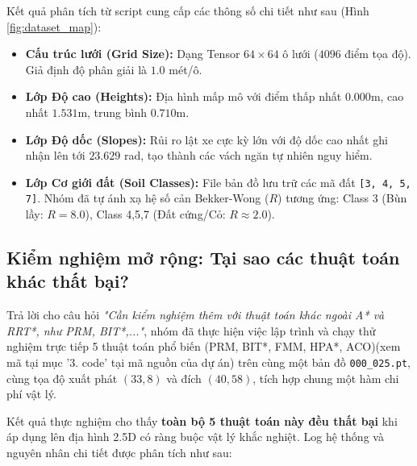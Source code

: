 \documentclass[12pt, a4paper]{article}
\begin{document}
Kết quả phân tích từ script cung cấp các thông số chi tiết như sau (Hình \ref{fig:dataset_map}):
\begin{itemize}
    \item \textbf{Cấu trúc lưới (Grid Size):} Dạng Tensor $64 \times 64$ ô lưới ($4096$ điểm tọa độ). Giả định độ phân giải là $1.0$ mét/ô.
    \item \textbf{Lớp Độ cao (Heights):} Địa hình mấp mô với điểm thấp nhất $0.000$m, cao nhất $1.531$m, trung bình $0.710$m.
    \item \textbf{Lớp Độ dốc (Slopes):} Rủi ro lật xe cực kỳ lớn với độ dốc cao nhất ghi nhận lên tới $23.629$ rad, tạo thành các vách ngăn tự nhiên nguy hiểm.
    \item \textbf{Lớp Cơ giới đất (Soil Classes):} File bản đồ lưu trữ các mã đất \texttt{[3, 4, 5, 7]}. Nhóm đã tự ánh xạ hệ số cản Bekker-Wong ($R$) tương ứng: Class 3 (Bùn lầy: $R=8.0$), Class 4,5,7 (Đất cứng/Cỏ: $R \approx 2.0$).
\end{itemize}

\subsection{Kiểm nghiệm mở rộng: Tại sao các thuật toán khác thất bại?}
Trả lời cho câu hỏi \textit{"Cần kiểm nghiệm thêm với thuật toán khác ngoài A* và RRT*, như PRM, BIT*,..."}, nhóm đã thực hiện việc lập trình và chạy thử nghiệm trực tiếp 5 thuật toán phổ biến (PRM, BIT*, FMM, HPA*, ACO)(xem mã tại mục '3. code' tại mã nguồn của dự án) trên cùng một bản đồ \texttt{000\_025.pt}, cùng tọa độ xuất phát $(33, 8)$ và đích $(40, 58)$, tích hợp chung một hàm chi phí vật lý. 

Kết quả thực nghiệm cho thấy \textbf{toàn bộ 5 thuật toán này đều thất bại} khi áp dụng lên địa hình 2.5D có ràng buộc vật lý khắc nghiệt. Log hệ thống và nguyên nhân chi tiết được phân tích như sau:
\end{document}
